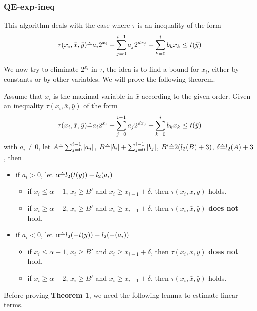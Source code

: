 \subsubsection{QE-exp-ineq}

This algorithm deals with the case where $\tau$ is an inequality of the form 
$$\tau(x_i,\bar{x},\bar{y}) \hat{=}  a_i 2^{x_i}+\sum_{j=0}^{i-1} a_j2^{d x_j} + \sum_{k=0}^{i}b_k x_k \le t(\bar{y})$$

We now try to eliminate $2^{x_i}$ in $\tau$, the idea is to find a bound for $x_i$, 
either by constants or by other variables.
We will prove the following theorem.

\begin{theorem} \label{thm:exp-ineq}
Assume that $x_i$ is the maximal variable in $\bar{x}$ according to the given order. 
Given an inequality $\tau(x_i,\bar{x},\bar{y})$ of the form %
$$\tau(x_i,\bar{x},\bar{y}) \hat{=}  a_i 2^{x_i}+\sum_{j=0}^{i-1} a_j2^{d x_j} + \sum_{k=0}^{i}b_k x_k \le t(\bar{y})$$
with $a_i \neq 0$, 
let $A\hat{=} \sum_{j=0}^{i-1}|a_j|$, 
$B\hat{=} |b_i| + \sum_{j=0}^{i-1}|b_j|$, 
$B'\hat{=} 2(l_2(B)+3)$,
$\delta\hat{=}  l_2(A)+3$, then 
\begin{itemize}
    \item if $a_i > 0$, let $\alpha \hat{=} l_2(t(y))-l_2(a_i)$
    \begin{itemize}
        \item if $x_i \le \alpha -1$, $x_i \ge B'$ and $x_{i} \ge x_{i-1} +\delta $, then $\tau(x_i,\bar{x},\bar{y})$ holds.
        \item if $x_i \ge \alpha +2$, $x_i \ge B'$ and $x_{i} \ge x_{i-1} +\delta $, then $\tau(x_i,\bar{x},\bar{y})$ \textbf{does not} hold.
    \end{itemize}
    \item if $a_i < 0$, let $\alpha \hat{=} l_2(-t(y))-l_2(-(a_i))$
    \begin{itemize}
        \item if $x_i \le \alpha -1$, $x_i \ge B'$ and $x_{i} \ge x_{i-1} +\delta $, then $\tau(x_i,\bar{x},\bar{y})$ \textbf{does not} hold.
        \item if $x_i \ge \alpha +2$, $x_i \ge B'$ and $x_{i} \ge x_{i-1} +\delta $, then $\tau(x_i,\bar{x},\bar{y})$ holds.
    \end{itemize}
\end{itemize}
\end{theorem}

Before proving \textbf{Theorem 1}, we need  the following lemma to estimate linear terms.

